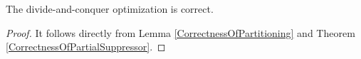 \begin{corollary}
The divide-and-conquer optimization \SplitData is correct.
\end{corollary}
\begin{proof}
It follows directly from Lemma \ref{CorrectnessOfPartitioning} and
Theorem \ref{CorrectnessOfPartialSuppressor}.
\end{proof}


